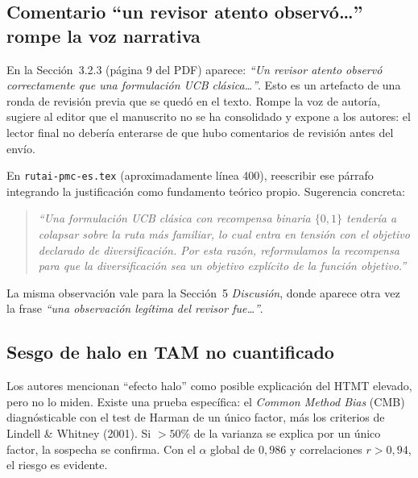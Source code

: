 \documentclass[11pt,a4paper]{article}
\begin{document}
\subsection{Comentario ``un revisor atento observ\'o\ldots'' rompe la voz narrativa}

\begin{deficiencia}[M.7 --- Deficiencia]
En la Secci\'on~3.2.3 (p\'agina 9 del PDF) aparece: \emph{``Un revisor atento observ\'o correctamente que una formulaci\'on UCB cl\'asica\ldots''}. Esto es un artefacto de una ronda de revisi\'on previa que se qued\'o en el texto. Rompe la voz de autor\'ia, sugiere al editor que el manuscrito no se ha consolidado y expone a los autores: el lector final no deber\'ia enterarse de que hubo comentarios de revisi\'on antes del env\'io.
\end{deficiencia}

\begin{abordaje}
En \texttt{rutai-pmc-es.tex} (aproximadamente l\'inea 400), reescribir ese p\'arrafo integrando la justificaci\'on como fundamento te\'orico propio. Sugerencia concreta:
\begin{quote}\small
\emph{``Una formulaci\'on UCB cl\'asica con recompensa binaria $\{0,1\}$ tender\'ia a colapsar sobre la ruta m\'as familiar, lo cual entra en tensi\'on con el objetivo declarado de diversificaci\'on. Por esta raz\'on, reformulamos la recompensa para que la diversificaci\'on sea un objetivo expl\'icito de la funci\'on objetivo.''}
\end{quote}
La misma observaci\'on vale para la Secci\'on~5 \emph{Discusi\'on}, donde aparece otra vez la frase \emph{``una observaci\'on leg\'itima del revisor fue\ldots''}.
\end{abordaje}

\subsection{Sesgo de halo en TAM no cuantificado}

\begin{deficiencia}[M.8 --- Deficiencia]
Los autores mencionan ``efecto halo'' como posible explicaci\'on del HTMT elevado, pero no lo miden. Existe una prueba espec\'ifica: el \emph{Common Method Bias} (CMB) diagn\'osticable con el test de Harman de un \'unico factor, m\'as los criterios de Lindell \& Whitney (2001). Si $>50\%$ de la varianza se explica por un \'unico factor, la sospecha se confirma. Con el $\alpha$ global de $0{,}986$ y correlaciones $r>0{,}94$, el riesgo es evidente.
\end{deficiencia}
\end{document}
